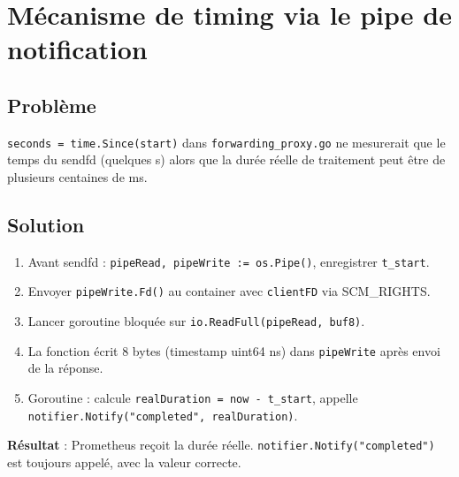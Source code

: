 \documentclass[11pt,a4paper]{article}
\begin{document}
\section{Mécanisme de timing via le pipe de notification}

\subsection{Problème}
\texttt{seconds = time.Since(start)} dans \texttt{forwarding\_proxy.go} ne mesurerait que le
temps du sendfd (quelques \textmu s) alors que la durée réelle de traitement peut être de plusieurs
centaines de ms.

\subsection{Solution}
\begin{enumerate}
  \item Avant sendfd : \texttt{pipeRead, pipeWrite := os.Pipe()}, enregistrer \texttt{t\_start}.
  \item Envoyer \texttt{pipeWrite.Fd()} au container avec \texttt{clientFD} via SCM\_RIGHTS.
  \item Lancer goroutine bloquée sur \texttt{io.ReadFull(pipeRead, buf8)}.
  \item La fonction écrit 8 bytes (timestamp uint64 ns) dans \texttt{pipeWrite} après envoi
    de la réponse.
  \item Goroutine : calcule \texttt{realDuration = now - t\_start}, appelle
    \texttt{notifier.Notify("completed", realDuration)}.
\end{enumerate}

\textbf{Résultat} : Prometheus reçoit la durée réelle. \texttt{notifier.Notify("completed")}
est toujours appelé, avec la valeur correcte.


\end{document}
